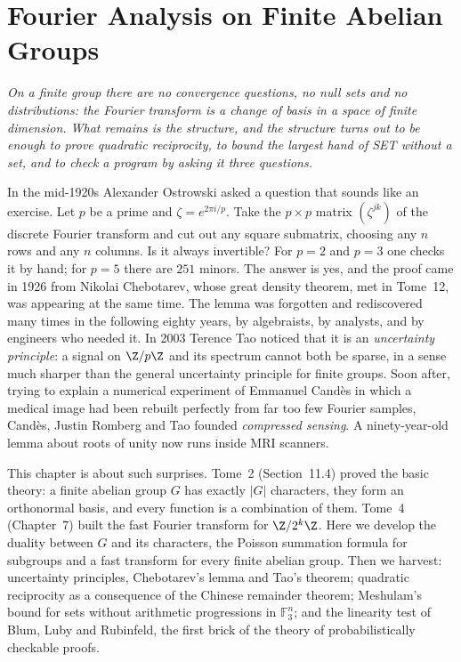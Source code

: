 \chapter{Fourier Analysis on Finite Abelian Groups}

\begin{center}\itshape
On a finite group there are no convergence questions, no null sets and no distributions: the Fourier transform is a change of basis
in a space of finite dimension. What remains is the structure, and the structure turns out to be enough to prove quadratic
reciprocity, to bound the largest hand of SET without a set, and to check a program by asking it three questions.
\end{center}

In the mid-1920s Alexander Ostrowski asked a question that sounds like an exercise. Let $p$ be a prime and
$\zeta=e^{2\pi i/p}$. Take the $p\times p$ matrix $(\zeta^{jk})$ of the discrete Fourier transform and cut out any square submatrix,
choosing any $n$ rows and any $n$ columns. Is it always invertible? For $p=2$ and $p=3$ one checks it by hand; for $p=5$ there are
$251$ minors. The answer is yes, and the proof came in 1926 from Nikolai Chebotarev, whose great density theorem, met in Tome~12, was appearing
at the same time. The lemma was forgotten and rediscovered many times in the following eighty years, by algebraists, by analysts, and by engineers who needed it. In 2003 Terence Tao noticed that it is an
\emph{uncertainty principle}: a signal on $\Z/p\Z$ and its spectrum cannot both be sparse, in a sense much sharper than the general
uncertainty principle for finite groups. Soon after, trying to explain a numerical experiment of Emmanuel Cand\`es in which a
medical image had been rebuilt perfectly from far too few Fourier samples, Cand\`es, Justin Romberg and Tao founded \emph{compressed
sensing}. A ninety-year-old lemma about roots of unity now runs inside MRI scanners.

This chapter is about such surprises. Tome~2 (Section~11.4) proved the basic theory: a finite abelian group $G$ has exactly $|G|$
characters, they form an orthonormal basis, and every function is a combination of them. Tome~4 (Chapter~7) built the fast Fourier
transform for $\Z/2^k\Z$. Here we develop the duality between $G$ and its characters, the Poisson summation formula for subgroups and
a fast transform for every finite abelian group. Then we harvest: uncertainty principles, Chebotarev's lemma and Tao's theorem;
quadratic reciprocity as a consequence of the Chinese remainder theorem; Meshulam's bound for sets without arithmetic progressions in
$\mathbb F_3^n$; and the linearity test of Blum, Luby and Rubinfeld, the first brick of the theory of probabilistically checkable proofs.

